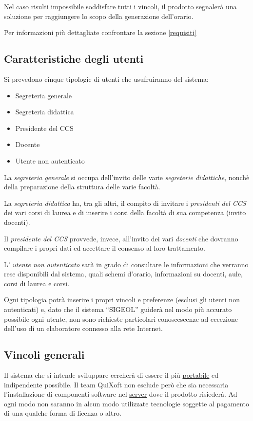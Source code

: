 \documentclass[11pt,a4paper]{article}
\begin{document}
Nel caso risulti impossibile soddisfare tutti i vincoli, il prodotto segnalerà una soluzione per raggiungere lo scopo della generazione dell'orario.

Per informazioni più dettagliate confrontare la sezione \ref{requisiti}
\subsection{Caratteristiche degli utenti} \label{utenti}
Si prevedono cinque tipologie di utenti che usufruiranno del sistema:
\begin{itemize}
 \item Segreteria generale
 \item Segreteria didattica
 \item Presidente del CCS
 \item Docente
 \item Utente non autenticato
\end{itemize}

La \textit{segreteria generale} si occupa dell'invito delle varie \textit{segreterie didattiche}, nonchè della preparazione della struttura delle varie facoltà.

La \textit{segreteria didattica} ha, tra gli altri, il compito di invitare i \textit{presidenti del CCS} dei vari corsi di laurea e di inserire i corsi della facoltà di sua competenza (invito docenti).

Il \textit{presidente del CCS} provvede, invece, all'invito dei vari \textit{docenti} che dovranno compilare i propri dati ed accettare il consenso al loro trattamento.

L' \textit{utente non autenticato} sarà in grado di consultare le informazioni che verranno rese disponibili dal sistema, quali schemi d'orario, informazioni su docenti, aule, corsi di laurea e corsi.

Ogni tipologia potrà inserire i propri vincoli e preferenze (esclusi gli utenti non autenticati) e, dato che il sistema ``SIGEOL'' guiderà nel modo più accurato possibile ogni utente, non sono richieste particolari conoscescenze ad eccezione dell'uso di un elaboratore connesso alla rete Internet.
\subsection{Vincoli generali}
Il sistema che si intende sviluppare cercherà di essere il più \underline{portabile} ed indipendente possibile. Il team QuiXoft non esclude però che sia necessaria l'installazione di componenti software nel \underline{server} dove il prodotto risiederà. Ad ogni modo non saranno in alcun modo utilizzate tecnologie soggette al pagamento di una qualche forma di licenza o altro.
\end{document}
